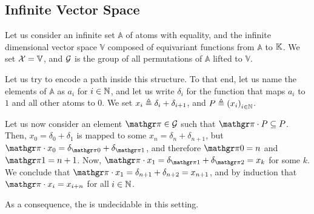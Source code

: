 \subsection{Infinite Vector Space}
\label{subsec:vector}

Let us consider an infinite set $\mathbb{A}$ of atoms with equality, and the
infinite dimensional vector space $\mathbb{V}$ composed of equivariant
functions from $\mathbb{A}$ to $\mathbb{K}$. We set $\mathcal{X} = \mathbb{V}$, and
$\mathcal{G}$ is the group of all permutations of $\mathbb{A}$
lifted to $\mathbb{V}$.

Let us try to encode a path inside this structure. To that end, let us name the
elements of $\mathbb{A}$ as $a_i$ for $i \in \mathbb{N}$, and let us write $\delta_i$
for the function that maps $a_i$ to $1$ and all other atoms to $0$. We set $x_i
\triangleq \delta_i + \delta_{i+1}$, and $P \defined \seqof{x_i}[i \in \N]$.

Let us now consider an element $\gelem \in \group$ such that $\gelem \cdot P
\subseteq P$. Then, $x_0 = \delta_0 + \delta_1$ is mapped to some $x_n =
\delta_n + \delta_{n+1}$, but $\gelem \cdot x_0 = \delta_{\gelem 0} +
\delta_{\gelem 1}$, and therefore $\gelem 0 = n$ and $\gelem 1 = n + 1$. Now,
$\gelem \cdot x_1 = \delta_{\gelem 1} + \delta_{\gelem 2} = x_k$ for some $k$.
We conclude that $\gelem \cdot x_1 = \delta_{n + 1} + \delta_{n + 2} = x_{n +
1}$, and by induction that $\gelem \cdot x_i = x_{i + n}$ for all $i \in \mathbb{N}$.

As a consequence, the  is undecidable
in this setting.



